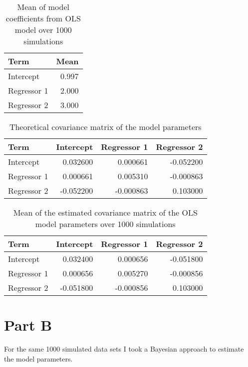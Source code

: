\documentclass[]{book}
\begin{document}
\begin{table}

\caption{\label{tab:lm-mean-coefs-q3}Mean of model coefficients from OLS model over 1000 simulations}
\centering
\begin{tabular}[t]{lr}
\toprule
Term & Mean\\
\midrule
Intercept & 0.997\\
Regressor 1 & 2.000\\
Regressor 2 & 3.000\\
\bottomrule
\end{tabular}
\end{table}

\begin{table}

\caption{\label{tab:theory-vcov-q3}Theoretical covariance matrix of the model parameters}
\centering
\begin{tabular}[t]{lrrr}
\toprule
Term & Intercept & Regressor 1 & Regressor 2\\
\midrule
Intercept & 0.032600 & 0.000661 & -0.052200\\
Regressor 1 & 0.000661 & 0.005310 & -0.000863\\
Regressor 2 & -0.052200 & -0.000863 & 0.103000\\
\bottomrule
\end{tabular}
\end{table}

\begin{table}

\caption{\label{tab:lm-est-vcov-q3}Mean of the estimated covariance matrix of the OLS model parameters over 1000 simulations}
\centering
\begin{tabular}[t]{lrrr}
\toprule
Term & Intercept & Regressor 1 & Regressor 2\\
\midrule
Intercept & 0.032400 & 0.000656 & -0.051800\\
Regressor 1 & 0.000656 & 0.005270 & -0.000856\\
Regressor 2 & -0.051800 & -0.000856 & 0.103000\\
\bottomrule
\end{tabular}
\end{table}

\hypertarget{part-b-2}{%
\section{Part B}\label{part-b-2}}

For the same 1000 simulated data sets I took a Bayesian approach to estimate the model parameters.
\end{document}
